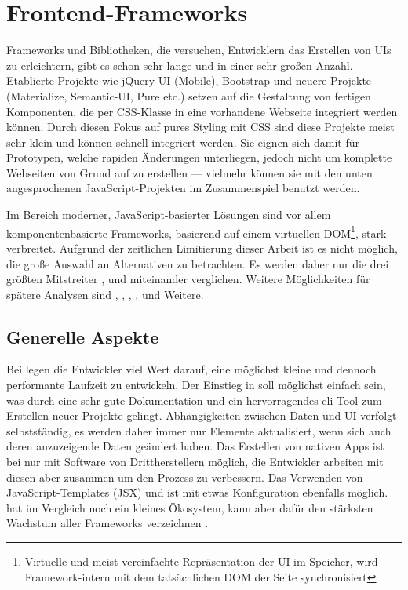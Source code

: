 \section{Frontend-Frameworks}
Frameworks und Bibliotheken, die versuchen, Entwicklern das Erstellen von UIs zu erleichtern, gibt es schon sehr lange und in einer sehr großen Anzahl. Etablierte Projekte wie jQuery-UI (Mobile), Bootstrap und neuere Projekte (Materialize, Semantic-UI, Pure etc.) setzen auf die Gestaltung von fertigen Komponenten, die per CSS-Klasse in eine vorhandene Webseite integriert werden können. Durch diesen Fokus auf pures Styling mit CSS sind diese Projekte meist sehr klein und können schnell integriert werden. Sie eignen sich damit für Prototypen, welche rapiden Änderungen unterliegen, jedoch nicht um komplette Webseiten von Grund auf zu erstellen --- vielmehr können sie mit den unten angesprochenen JavaScript-Projekten im Zusammenspiel benutzt werden.

Im Bereich moderner, JavaScript-basierter Lösungen sind vor allem komponentenbasierte Frameworks, basierend auf einem virtuellen DOM\footnote{Virtuelle und meist vereinfachte Repräsentation der UI im Speicher, wird Framework-intern mit dem tatsächlichen DOM der Seite synchronisiert}, stark verbreitet. Aufgrund der zeitlichen Limitierung dieser Arbeit ist es nicht möglich, die große Auswahl an Alternativen zu betrachten. Es werden daher nur die drei größten Mitstreiter ,  und  \parencite[vgl.][]{greif_benitte_rambeau_2018} miteinander verglichen. Weitere Möglichkeiten für spätere Analysen sind , , , , und Weitere.

\subsection{Generelle Aspekte}
Bei  legen die Entwickler viel Wert darauf, eine möglichst kleine und dennoch performante Laufzeit zu entwickeln. Der Einstieg in  soll möglichst einfach sein, was durch eine sehr gute Dokumentation und ein hervorragendes \gls{cli}-Tool zum Erstellen neuer Projekte gelingt. Abhängigkeiten zwischen Daten und UI verfolgt  selbstständig, es werden daher immer nur Elemente aktualisiert, wenn sich auch deren anzuzeigende Daten geändert haben. Das Erstellen von nativen Apps ist bei  nur mit Software von Drittherstellern möglich, die Entwickler arbeiten mit diesen aber zusammen um den Prozess zu verbessern. Das Verwenden von JavaScript-Templates (JSX) und  ist mit etwas Konfiguration ebenfalls möglich.  hat im Vergleich noch ein kleines Ökosystem, kann aber dafür den stärksten Wachstum aller Frameworks verzeichnen \parencite[vgl.][]{npmjs_2018}.

